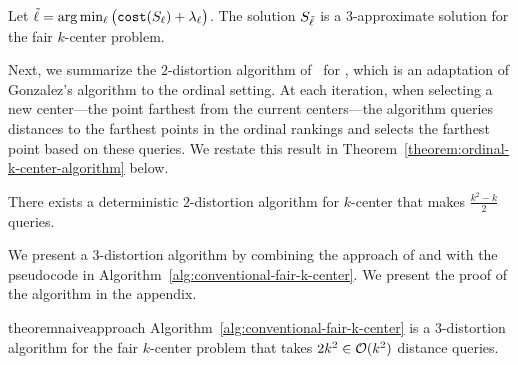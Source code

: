 \begin{corollary}
    \label{corollary:conventional-lambda-ell-star-lower-bound}
    Let $\tilde{\ell} = \arg\min_{\ell} \big(\texttt{cost}(S_{\ell}) + \lambda_{\ell}\big)$.
    The solution $S_{\tilde{\ell}}$ is a $3$-approximate solution for the fair $k$-center problem.
\end{corollary}


Next, we summarize the $2$-distortion algorithm of~\citet{burkhardt2024low} for \ordkcen, which is an adaptation of Gonzalez's algorithm to the ordinal setting. At each iteration, when selecting a new center---the point farthest from the current centers---the algorithm queries distances to the farthest points in the ordinal rankings and selects the farthest point based on these queries. We restate this result in Theorem~\ref{theorem:ordinal-k-center-algorithm} below.


\begin{theorem}
\label{theorem:ordinal-k-center-algorithm}
There exists a deterministic $2$-distortion algorithm for $k$-center that makes $\frac{k^2 - k}{2}$
queries.
\end{theorem}

We present a $3$-distortion algorithm by combining the approach of \citet{gadekar2025fair} and \citet{burkhardt2024low} with the pseudocode in Algorithm~\ref{alg:conventional-fair-k-center}.
We present the proof of the algorithm in the appendix.



\begin{restatable}{theorem}{naiveapproach}
\label{lemma:naive-approach}
Algorithm~\ref{alg:conventional-fair-k-center} is a $3$-distortion algorithm for the fair $k$-center problem that takes $2k^2 \in \mathcal{O}(k^2)$ distance queries.
\end{restatable}



